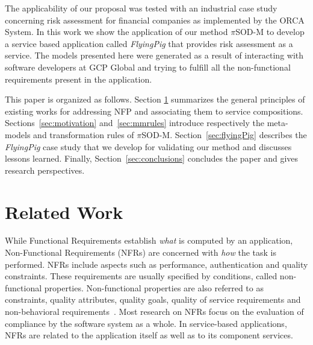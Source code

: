 \documentclass{singlecol-new}
\theoremstyle{TH}{
\newtheorem{lemma}{Lemma}
\newtheorem{theorem}[lemma]{Theorem}
\newtheorem{corrolary}[lemma]{Corrolary}
\newtheorem{conjecture}[lemma]{Conjecture}
\newtheorem{proposition}[lemma]{Proposition}
\newtheorem{claim}[lemma]{Claim}
\newtheorem{stheorem}[lemma]{Wrong Theorem}
\newtheorem{algorithm}{Algorithm}
}
\theoremstyle{THrm}{
\newtheorem{definition}{Definition}[section]
\newtheorem{question}{Question}[section]
\newtheorem{remark}{Remark}
\newtheorem{scheme}{Scheme}
}
\theoremstyle{THhit}{
\newtheorem{case}{Case}[section]
}
\theoremstyle{THhsl}{
\newtheorem{example}{Example}
}
\newcommand{\pisodm}[0]{$\pi$SOD-M\xspace}
\def\FlyingPig{\textsl{FlyingPig}\xspace}
\begin{document}
The applicability of our proposal was tested with an industrial case study concerning risk assessment for financial companies as implemented by the ORCA System\footnotemark {}. In this work we show the application of our method \pisodm to develop a service based application called \FlyingPig that provides risk assessment as a service.
The models presented here were generated as a result of interacting with software developers at GCP Global and trying to fulfill  all the non-functional requirements present in the application.

This paper is organized as follows.
Sec\-tion \ref{sec:relworks} summarizes the general principles of existing works for addressing NFP and associating them to service compositions.
Sections~\ref{sec:motivation} and~\ref{sec:mmrules} introduce respectively the meta-models and transformation rules of \pisodm.
Section~\ref{sec:flyingPig} describes the \FlyingPig case study that we develop for validating our method and discusses lessons learned.
Finally, Section~\ref{sec:conclusions} concludes the paper and gives research perspectives.

\section{Related Work}
\label{sec:relworks}

While Functional Requirements establish \textit{what} is computed by an application, Non-Functional Requirements (NFRs) are concerned with \textit{how} the task is performed.
NFRs include aspects such as performance, authentication and quality constraints.
These requirements are usually specified by conditions, called non-functional properties.
Non-functional properties are also referred to as constraints, quality attributes, quality goals, quality of service requirements and non-behavioral requirements~\cite{Chung91,MylopoulosBook99,Chung2009}.
%
Most research  on NFRs focus on the evaluation of compliance by the software system as a whole. %
In service-based applications, NFRs are related to the application itself as well as to  its component services.
\end{document}
